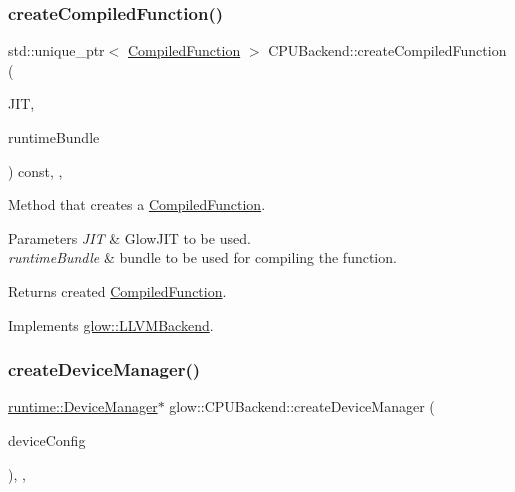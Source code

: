 \subsubsection{\texorpdfstring{create\+Compiled\+Function()}{createCompiledFunction()}}
{\footnotesize\ttfamily std\+::unique\+\_\+ptr$<$ \hyperlink{classglow_1_1_compiled_function}{Compiled\+Function} $>$ C\+P\+U\+Backend\+::create\+Compiled\+Function (\begin{DoxyParamCaption}\item[{std\+::unique\+\_\+ptr$<$ \hyperlink{classllvm_1_1orc_1_1_glow_j_i_t}{llvm\+::orc\+::\+Glow\+J\+IT} $>$}]{J\+IT,  }\item[{\hyperlink{classglow_1_1runtime_1_1_runtime_bundle}{runtime\+::\+Runtime\+Bundle} \&\&}]{runtime\+Bundle }\end{DoxyParamCaption}) const\hspace{0.3cm}{\ttfamily [override]}, {\ttfamily [protected]}, {\ttfamily [virtual]}}

Method that creates a \hyperlink{classglow_1_1_compiled_function}{Compiled\+Function}. 
\begin{DoxyParams}{Parameters}
{\em J\+IT} & Glow\+J\+IT to be used. \\
\hline
{\em runtime\+Bundle} & bundle to be used for compiling the function. \\
\hline
\end{DoxyParams}
\begin{DoxyReturn}{Returns}
created \hyperlink{classglow_1_1_compiled_function}{Compiled\+Function}. 
\end{DoxyReturn}


Implements \hyperlink{classglow_1_1_l_l_v_m_backend_a521d4ed1c118a5a0e5a2e81e4688842e}{glow\+::\+L\+L\+V\+M\+Backend}.

\mbox{\label{classglow_1_1_c_p_u_backend_a038b765b85ac399a91437a82f044f28d}} 
\subsubsection{\texorpdfstring{create\+Device\+Manager()}{createDeviceManager()}}
{\footnotesize\ttfamily \hyperlink{classglow_1_1runtime_1_1_device_manager}{runtime\+::\+Device\+Manager}$\ast$ glow\+::\+C\+P\+U\+Backend\+::create\+Device\+Manager (\begin{DoxyParamCaption}\item[{const \hyperlink{structglow_1_1runtime_1_1_device_config}{runtime\+::\+Device\+Config} \&}]{device\+Config }\end{DoxyParamCaption})\hspace{0.3cm}{\ttfamily [inline]}, {\ttfamily [override]}, {\ttfamily [virtual]}}


